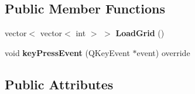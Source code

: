 \subsection*{Public Member Functions}
\begin{DoxyCompactItemize}
\item 
\mbox{\label{classGame1Grid_a019f169cfa7cb777887ec2e8773c7e17}} 
vector$<$ vector$<$ int $>$ $>$ {\bfseries Load\+Grid} ()
\item 
\mbox{\label{classGame1Grid_af0ee0c96e8995ce18eddecafca1fdcfc}} 
void {\bfseries key\+Press\+Event} (Q\+Key\+Event $\ast$event) override
\end{DoxyCompactItemize}
\subsection*{Public Attributes}
